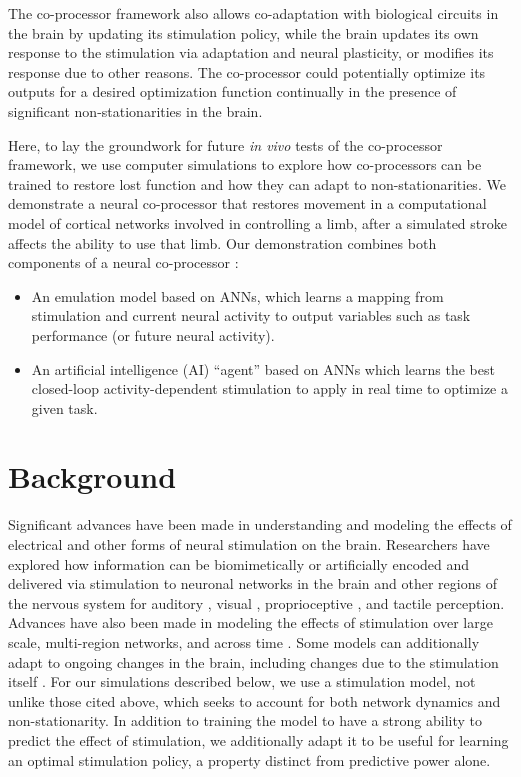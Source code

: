 \documentclass[12pt]{iopart}
\begin{document}
The co-processor framework also allows co-adaptation with biological circuits in the brain by updating its 
stimulation policy, while the brain updates its own response to the stimulation via adaptation and neural
plasticity, or modifies its response due to other reasons. The co-processor could potentially optimize its outputs 
for a desired optimization function continually in the presence of significant non-stationarities in the brain.

Here, to lay the groundwork for future \textit{in vivo} tests of the co-processor framework, we 
use computer simulations to explore how co-processors can be trained to restore lost function and how they can adapt to 
 non-stationarities. We demonstrate a neural co-processor that restores movement in a
computational model of cortical networks involved in controlling a limb, after a simulated stroke affects the
ability to use that limb. Our demonstration combines both components of a neural co-processor \cite{rao.coproc}:
\begin{itemize}
	\item An emulation model based on ANNs, which learns a mapping from  
	      stimulation and current neural activity to output variables such as task performance (or future neural activity).
	\item An artificial intelligence (AI) ``agent'' based on ANNs which learns the best  closed-loop
          activity-dependent stimulation to apply in real time to optimize a given task.
\end{itemize}

\section{Background}
\label{sec:background}

Significant advances have been made in understanding and modeling the effects of electrical and other forms of
neural stimulation on the brain. Researchers have explored how information can be biomimetically or
artificially encoded and delivered via stimulation to neuronal networks in the brain and
other regions of the nervous system for auditory \cite{niparko.cochlear}, visual \cite{weiland.retinal},
proprioceptive \cite{tomlinson.propr}, and tactile
\cite{tabot.tact, tyler.tact, dadarlat.tact, sharlene.tact, cronin.tact} perception.
Advances have also been made in modeling the effects of stimulation over large scale, multi-region
networks, and across time \cite{shanechi.stimmodel}. Some models can additionally adapt to ongoing
changes in the brain, including changes due to the stimulation itself
\cite{tafazoli.acls}. For our simulations described below, we use a stimulation
model, not unlike those cited above, which seeks to account for both network dynamics
and non-stationarity. In addition to training the model to have a strong ability to predict
the effect of stimulation, we additionally adapt it to be useful for learning an
optimal stimulation policy, a property distinct from predictive
power alone.
\end{document}
